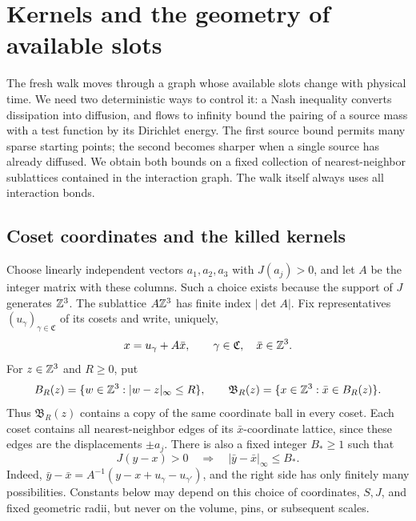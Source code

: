 \section{Kernels and the geometry of available slots}\label{sec:geometry}

The fresh walk moves through a graph whose available slots change with
physical time.  We need two deterministic ways to control it: a Nash
inequality converts dissipation into diffusion, and flows to infinity
bound the pairing of a source mass with a test function by its Dirichlet
energy.  The first source bound permits many sparse starting points;
the second becomes sharper when a single source has already diffused.
We obtain both bounds on a fixed collection of nearest-neighbor
sublattices contained in the interaction graph.  The walk itself always
uses all interaction bonds.

\subsection{Coset coordinates and the killed kernels}

Choose linearly independent vectors \(a_1,a_2,a_3\) with \(J(a_j)>0\),
and let \(A\) be the integer matrix with these columns.  Such a choice
exists because the support of \(J\) generates \(\mathbb Z^3\).
The sublattice \(A\mathbb Z^3\) has finite index \(|\det A|\).  Fix
representatives \((u_\gamma)_{\gamma\in\mathfrak C}\) of its cosets and
write, uniquely,
\begin{equation}\label{eq:coset-coordinates}
 x=u_\gamma+A\bar x,
 \qquad \gamma\in\mathfrak C,\quad \bar x\in\mathbb Z^3.
\end{equation}
For \(z\in\mathbb Z^3\) and \(R\ge0\), put
\[
 B_R(z)=\{w\in\mathbb Z^3:|w-z|_\infty\le R\},
 \qquad
 \mathfrak B_R(z)=\{x\in\mathbb Z^3:\bar x\in B_R(z)\}.
\]
Thus \(\mathfrak B_R(z)\) contains a copy of the same coordinate ball
in every coset.  Each coset contains all nearest-neighbor edges of its
\(\bar x\)-coordinate lattice, since these edges are the displacements
\(\pm a_j\).  There is also a fixed integer \(B_*\ge1\) such that
\begin{equation}\label{eq:bond-coordinate-range}
 J(y-x)>0\quad\Longrightarrow\quad
 |\bar y-\bar x|_\infty\le B_*.
\end{equation}
Indeed, \(\bar y-\bar x=A^{-1}(y-x+u_\gamma-u_{\gamma'})\), and the
right side has only finitely many possibilities.  Constants below may
depend on this choice of coordinates, \(S,J\), and fixed geometric
radii, but never on the volume, pins, or subsequent scales.

